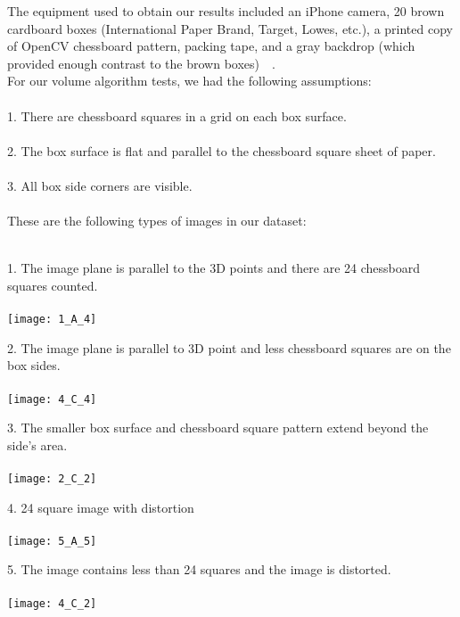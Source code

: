 \documentclass[11pt, twoside, reqno]{book}
\begin{document}
	
	The equipment used to obtain our results included an iPhone camera, 20 brown cardboard boxes (International Paper Brand, Target, Lowes, etc.), a printed copy of OpenCV chessboard pattern, packing tape, and a gray backdrop (which provided enough contrast to the brown boxes)~\cite{gregProc}~\cite{intpaper}. \\
	For our volume algorithm tests, we had the following assumptions: \\
	\\
	1. There are chessboard squares in a grid on each box surface.\\
	\\
	2. The box surface is flat and parallel to the chessboard square sheet of paper.\\
	\\
	3. All box side corners are visible.  \\
	\\
	These are the following types of images in our dataset: \\ \\
	\FloatBarrier
	\graphicspath{ {images/} }
	1. The image plane is parallel to the 3D points and there are 24 chessboard squares counted.  \\ \\
	\texttt{[image: 1\_A\_4]}
	\\ 
	
	\graphicspath{ {images/} }
	2. The image plane is parallel to 3D point and less chessboard squares are on the box sides. \\ \\
	\texttt{[image: 4\_C\_4]} \\
	
	\graphicspath{ {images/} } 
	
	3. The smaller box surface and chessboard square pattern extend beyond the side's area.\\ \\
	\texttt{[image: 2\_C\_2]} \\ 
	
	\graphicspath{ {images/} }
	4. 24 square image with distortion \\ \\
	\texttt{[image: 5\_A\_5]}\\ 
	
	\graphicspath{ {images/} }
	5. The image contains less than 24 squares and the image is distorted. \\ \\
	\texttt{[image: 4\_C\_2]}  \\ 
\end{document}
